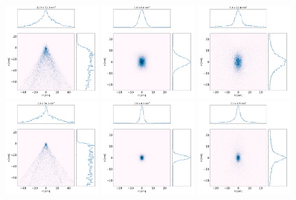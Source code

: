 \documentclass[a4paper, 11pt]{article}
\begin{document}
\begin{figure}[h]
\centering
\includegraphics[width=0.32\textwidth]{figures/M0-2_toroid.png}
\includegraphics[width=0.32\textwidth]{figures/M0p2_diaboloid.png}
\includegraphics[width=0.32\textwidth]{figures/M0p2_parabolic-cone.png}
\includegraphics[width=0.32\textwidth]{figures/M0p1_toroid.png}
\includegraphics[width=0.32\textwidth]{figures/M0p1_diaboloid.png}
\includegraphics[width=0.32\textwidth]{figures/M0p1_parabolic-cone.png}
\caption{\label{fig:raytracingM0p2}
}
\end{figure}
\end{document}
